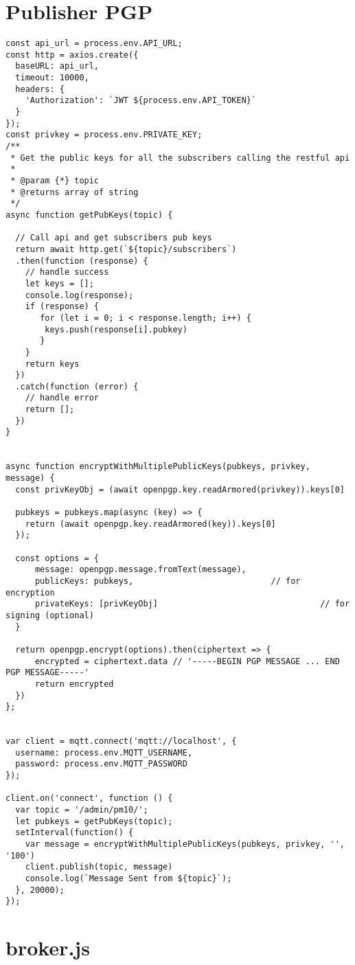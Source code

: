 \section{Publisher PGP}
\begin{footnotesize}
\begin{verbatim}
const api_url = process.env.API_URL;
const http = axios.create({
  baseURL: api_url,
  timeout: 10000,
  headers: {
    'Authorization': `JWT ${process.env.API_TOKEN}`
  }
});
const privkey = process.env.PRIVATE_KEY;
/**
 * Get the public keys for all the subscribers calling the restful api
 *
 * @param {*} topic
 * @returns array of string
 */
async function getPubKeys(topic) {
  
  // Call api and get subscribers pub keys
  return await http.get(`${topic}/subscribers`)
  .then(function (response) {
    // handle success
    let keys = [];
    console.log(response);
    if (response) {
       for (let i = 0; i < response.length; i++) {
        keys.push(response[i].pubkey)
       }
    }
    return keys
  })
  .catch(function (error) {
    // handle error
    return [];
  })
}


async function encryptWithMultiplePublicKeys(pubkeys, privkey, message) {
  const privKeyObj = (await openpgp.key.readArmored(privkey)).keys[0]

  pubkeys = pubkeys.map(async (key) => {
    return (await openpgp.key.readArmored(key)).keys[0]
  });

  const options = {
      message: openpgp.message.fromText(message),
      publicKeys: pubkeys,           				  // for encryption
      privateKeys: [privKeyObj]                                 // for signing (optional)
  }

  return openpgp.encrypt(options).then(ciphertext => {
      encrypted = ciphertext.data // '-----BEGIN PGP MESSAGE ... END PGP MESSAGE-----'
      return encrypted
  })
};


var client = mqtt.connect('mqtt://localhost', {
  username: process.env.MQTT_USERNAME,
  password: process.env.MQTT_PASSWORD
});

client.on('connect', function () {
  var topic = '/admin/pm10/';
  let pubkeys = getPubKeys(topic);
  setInterval(function() {
    var message = encryptWithMultiplePublicKeys(pubkeys, privkey, '', '100')
    client.publish(topic, message)
    console.log(`Message Sent from ${topic}`);
  }, 20000);
});
\end{verbatim}
\end{footnotesize}


\section{broker.js}
\begin{footnotesize}
\begin{verbatim}
\end{verbatim}
\end{footnotesize}